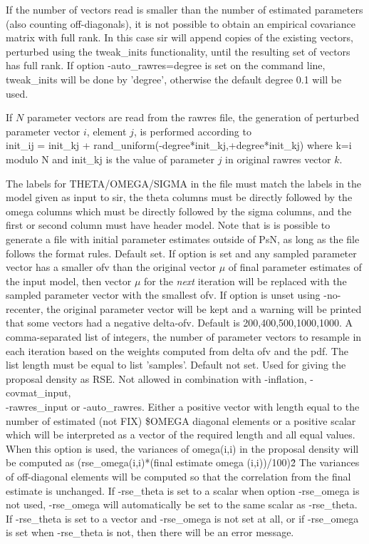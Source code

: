 \begin{optionlist}
If the number of vectors read is smaller than the number of estimated parameters (also counting off-diagonals), it is not possible to obtain an empirical covariance matrix with full rank. In this case sir will append copies of the existing vectors, perturbed using the tweak\_inits functionality, until the resulting set of vectors has full rank. If option -auto\_rawres=degree is set on the command line, tweak\_inits will be done by 'degree', otherwise the default degree 0.1 will be used.

If $N$ parameter vectors are read from the rawres file, the generation of perturbed parameter vector $i$, element $j$, is performed according to\\
 init\_ij = init\_kj + rand\_uniform(-degree*init\_kj,+degree*init\_kj) where k=i modulo N and init\_kj is the value of parameter $j$ in original rawres vector $k$.

The labels for  THETA/OMEGA/SIGMA in the file must match the labels in the model given as input to sir, the theta columns must be directly followed by the omega columns which must be directly followed by the sigma columns, and the first or
second column must have header model. Note that is is possible to generate a file with initial parameter estimates outside
of PsN, as long as the file follows the format rules.
\nextopt
{}
Default set. If option is set and any sampled parameter vector has a smaller ofv than the original vector $\mu$ of final parameter estimates of the input model, then vector $\mu$ for the \emph{next} iteration will be replaced with the sampled parameter vector with the smallest ofv. If option is unset using -no-recenter, the original parameter vector will be kept
and a warning will be printed that some vectors had a negative delta-ofv.
\nextopt
{}
Default is 200,400,500,1000,1000. A comma-separated list of integers, the number of parameter vectors to resample in each iteration based on the weights computed from delta ofv and the pdf. The list length must be equal to list 'samples'.
\nextopt
{}
Default not set. Used for giving the proposal density as RSE. %
Not allowed in combination with -inflation, -covmat\_input,\\ -rawres\_input or -auto\_rawres. Either a positive vector with length equal to the number of estimated (not FIX) \$OMEGA diagonal elements or a positive scalar which will be interpreted as a vector of the required length and all equal values. When this option is used, the variances of omega(i,i) in the proposal density will be computed as (rse\_omega(i,i)*(final estimate omega (i,i))/100)\^2 The variances of off-diagonal elements will be computed so that the correlation from the final estimate is unchanged. If -rse\_theta is set to a scalar when option -rse\_omega is not used, -rse\_omega will automatically be set to the same scalar as -rse\_theta. If -rse\_theta is set to a vector and -rse\_omega is not set at all, or if -rse\_omega is set when -rse\_theta is not, then there will be an error message.


\end{optionlist}
